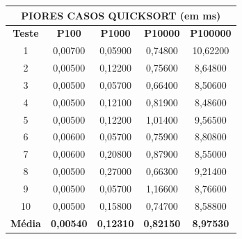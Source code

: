 \documentclass[a4paper, 12pt]{article}
\begin{document}
\begin{minipage}{1.05\textwidth}
 \begin{minipage}[c]{0.46\textwidth}
 \centering 
\begin{tabular}{ccccc}
     \multicolumn{ 5}{c}{{\bf PIORES CASOS QUICKSORT (em ms)}} \\
\hline
{\bf Teste} & {\bf P100} & {\bf P1000} & {\bf P10000} & {\bf P100000} \\
\hline
         1 &    0,00700 &    0,05900 &    0,74800 &   10,62200 \\
\hline
         2 &    0,00500 &    0,12200 &    0,75600 &    8,64800 \\
\hline
         3 &    0,00500 &    0,05700 &    0,66400 &    8,50600 \\
\hline
         4 &    0,00500 &    0,12100 &    0,81900 &    8,48600 \\
\hline
         5 &    0,00500 &    0,12200 &    1,01400 &    9,56500 \\
\hline
         6 &    0,00600 &    0,05700 &    0,75900 &    8,80800 \\
\hline
         7 &    0,00600 &    0,20800 &    0,87900 &    8,55000 \\
\hline
         8 &    0,00500 &    0,27000 &    0,66300 &    9,21400 \\
\hline
         9 &    0,00500 &    0,05700 &    1,16600 &    8,76600 \\
\hline
        10 &    0,00500 &    0,15800 &    0,74700 &    8,58800 \\
\hline
{\bf Média} & {\bf 0,00540} & {\bf 0,12310} & {\bf 0,82150} & {\bf 8,97530} \\
\hline
\end{tabular}  
\end{minipage}\hfill
\begin{minipage}[c]{0.49\textwidth}
\centering
{}
\end{minipage}
\end{minipage}\hfill
\vspace{0.5cm}
\end{document}
